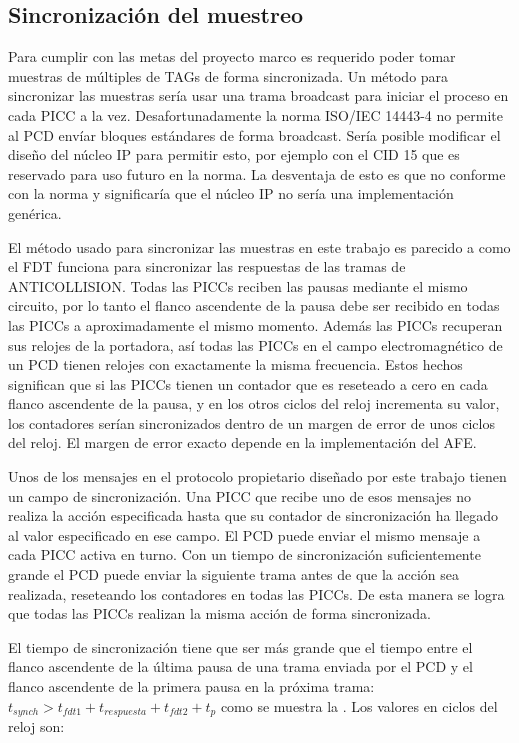 \documentclass[a4paper, twoside, 11pt]{report}
\begin{document}
\FloatBarrier
\subsection{Sincronización del muestreo}

Para cumplir con las metas del proyecto marco es requerido poder tomar muestras de múltiples de TAGs de forma sincronizada. Un método para sincronizar las muestras sería usar una trama broadcast para iniciar el proceso en cada PICC a la vez. Desafortunadamente la norma ISO/IEC 14443-4 no permite al PCD envíar bloques estándares de forma broadcast. Sería posible modificar el diseño del núcleo IP para permitir esto, por ejemplo con el CID 15 que es reservado para uso futuro en la norma. La desventaja de esto es que no conforme con la norma y significaría que el núcleo IP no sería una implementación genérica.

El método usado para sincronizar las muestras en este trabajo es parecido a como el FDT funciona para sincronizar las respuestas de las tramas de ANTICOLLISION. Todas las PICCs reciben las pausas mediante el mismo circuito, por lo tanto el flanco ascendente de la pausa debe ser recibido en todas las PICCs a aproximadamente el mismo momento. Además las PICCs recuperan sus relojes de la portadora, así todas las PICCs en el campo electromagnético de un PCD tienen relojes con exactamente la misma frecuencia. Estos hechos significan que si las PICCs tienen un contador que es reseteado a cero en cada flanco ascendente de la pausa, y en los otros ciclos del reloj incrementa su valor, los contadores serían sincronizados dentro de un margen de error de unos ciclos del reloj. El margen de error exacto depende en la implementación del AFE.

Unos de los mensajes en el protocolo propietario diseñado por este trabajo tienen un campo de sincronización. Una PICC que recibe uno de esos mensajes no realiza la acción especificada hasta que su contador de sincronización ha llegado al valor especificado en ese campo. El PCD puede enviar el mismo mensaje a cada PICC activa en turno. Con un tiempo de sincronización suficientemente grande el PCD puede enviar la siguiente trama antes de que la acción sea realizada, reseteando los contadores en todas las PICCs. De esta manera se logra que todas las PICCs realizan la misma acción de forma sincronizada.

El tiempo de sincronización tiene que ser más grande que el tiempo entre el flanco ascendente de la última pausa de una trama enviada por el PCD y el flanco ascendente de la primera pausa en la próxima trama: $t_{synch} > t_{fdt1} + t_{respuesta} + t_{fdt2} + t_p$ como se muestra la . Los valores en ciclos del reloj son:
\end{document}
